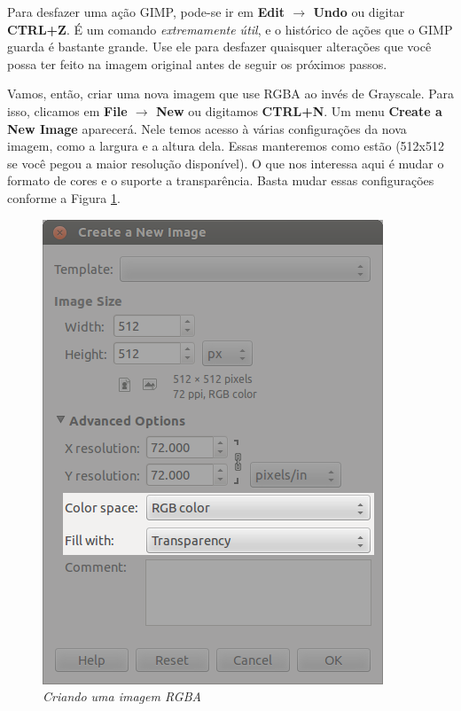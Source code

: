 \documentclass[12pt,onecolumn]{article}
\begin{document}
    \begin{framed}
      Para desfazer uma ação GIMP, pode-se ir em {\bf Edit $\rightarrow$ Undo}
      ou digitar {\bf CTRL+Z}. É um comando {\it extremamente útil}, e o
      histórico de ações que o GIMP guarda é bastante grande. Use ele para
      desfazer quaisquer alterações que você possa ter feito na imagem original
      antes de seguir os próximos passos.
    \end{framed}
    
    Vamos, então, criar uma nova imagem que use RGBA ao invés de Grayscale. Para
    isso, clicamos em {\bf File $\rightarrow$ New} ou digitamos {\bf CTRL+N}. Um
    menu {\bf Create a New Image} aparecerá. Nele temos acesso à várias
    configurações da nova imagem, como a largura e a altura dela. Essas
    manteremos como estão (512x512 se você pegou a maior resolução disponível).
    O que nos interessa aqui é mudar o formato de cores e o suporte a
    transparência. Basta mudar essas configurações conforme a Figura
    \ref{fig:grayscale_to_RGBA}.
    
    \begin{figure}[H]
      \centering
      \includegraphics[scale=.55]{screenshots/00-grayscale_to_RGBA.png}
      \caption{
        \footnotesize
        \it
        Criando uma imagem RGBA
      }
      \label{fig:grayscale_to_RGBA}
    \end{figure}
    
\end{document}
